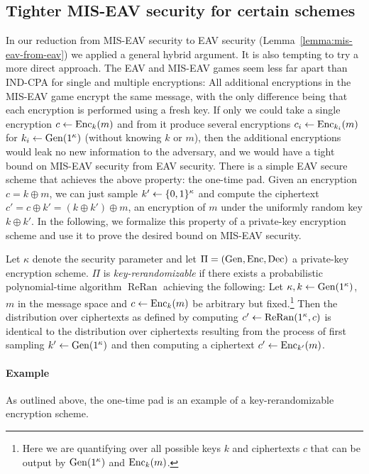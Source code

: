 \subsection{Tighter MIS-EAV security for certain schemes} \label{sec:tighter-mis-eav-security}

In our reduction from MIS-EAV security to EAV security (Lemma~\ref{lemma:mis-eav-from-eav}) we applied a general hybrid argument. It is also tempting to try a more direct approach. The EAV and MIS-EAV games seem less far apart than IND-CPA for single and multiple encryptions: All additional encryptions in the MIS-EAV game encrypt the same message, with the only difference being that each encryption is performed using a fresh key. If only we could take a single encryption $c \leftarrow \mathrm{Enc}_k(m)$ and from it produce several encryptions $c_i \leftarrow \mathrm{Enc}_{k_i}(m)$ for $k_i \leftarrow \mathrm{Gen}(1^\kappa)$ (without knowing $k$ or $m$), then the additional encryptions would leak no new information to the adversary, and we would have a tight bound on MIS-EAV security from EAV security. There is a simple EAV secure scheme that achieves the above property: the one-time pad. Given an encryption $c = k \oplus m$, we can just sample $k' \leftarrow \{0, 1\}^\kappa$ and compute the ciphertext $c' = c \oplus k' = (k \oplus k') \oplus m$, an encryption of $m$ under the uniformly random key $k \oplus k'$. In the following, we formalize this property of a private-key encryption scheme and use it to prove the desired bound on MIS-EAV security.

\begin{definition} \label{def:key-rerandomizability}
	Let $\kappa$ denote the security parameter and let $\Pi = (\mathrm{Gen}, \mathrm{Enc}, \mathrm{Dec})$ a private-key encryption scheme. $\Pi$ is \emph{key-rerandomizable} if there exists a probabilistic polynomial-time algorithm $\operatorname{ReRan}$ achieving the following: Let $\kappa, k \leftarrow \mathrm{Gen}(1^\kappa)$, $m$ in the message space and $c \leftarrow \mathrm{Enc}_k(m)$ be arbitrary but fixed.\footnote{Here we are quantifying over all possible keys $k$ and ciphertexts $c$ that can be output by $\mathrm{Gen}(1^\kappa)$ and $\mathrm{Enc}_k(m)$.} Then the distribution over ciphertexts as defined by computing $c' \leftarrow \operatorname{ReRan}(1^\kappa, c)$ is identical to the distribution over ciphertexts resulting from the process of first sampling $k' \leftarrow \mathrm{Gen}(1^\kappa)$ and then computing a ciphertext $c' \leftarrow \mathrm{Enc}_{k'}(m)$.
\end{definition}

\paragraph{Example} As outlined above, the one-time pad is an example of a key-rerandomizable encryption scheme.

